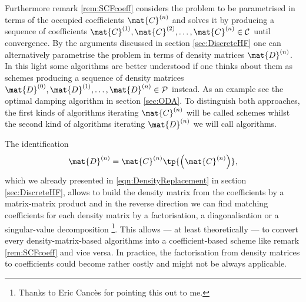 Furthermore remark \ref{rem:SCFcoeff}
considers the \HF problem to be parametrised
in terms of the occupied coefficients $\mat{C}^{(n)}$
and solves it by producing a sequence of coefficients
$\mat{C}^{(1)}, \mat{C}^{(2)}, \ldots, \mat{C}^{(n)} \in \mathcal{C}$
until convergence.
By the arguments discussed in section \ref{sec:DiscreteHF}
one can alternatively parametrise the \HF problem in terms of
density matrices $\mat{D}^{(n)}$.
In this light some \SCF algorithms are better understood
if one thinks about them as schemes producing
a sequence of density matrices
$\mat{D}^{(0)}, \mat{D}^{(1)}, \ldots, \mat{D}^{(n)} \in \mathcal{P}$
instead.
As an example
see the optimal damping algorithm in section \vref{sec:ODA}.
To distinguish both approaches,
the first kinds of algorithms iterating $\mat{C}^{(n)}$
will be called  schemes
whilst the second kind of algorithms iterating $\mat{D}^{(n)}$
we will call  algorithms.

\noindent
The identification
\[ \mat{D}^{(n)} = \mat{C}^{(n)} \tp{\left(\mat{C}^{(n)}\right)}, \]
which we already presented in \eqref{eqn:DensityReplacement} in section \ref{sec:DiscreteHF},
allows to build the density matrix from the coefficients by a matrix-matrix product
and in the reverse direction we can find matching coefficients for each density
matrix by a factorisation,
\eg a diagonalisation or a singular-value decomposition%
\footnote{Thanks to Eric Cancès for pointing this out to me.}.
This allows --- at least theoretically --- to convert
every density-matrix-based algorithms
into a coefficient-based scheme like remark \ref{rem:SCFcoeff}
and vice versa.
In practice, the factorisation from density matrices to coefficients
could become rather costly and might not be always applicable.
